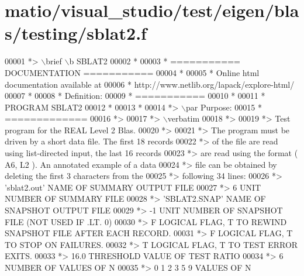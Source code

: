 \hypertarget{matio_2visual__studio_2test_2eigen_2blas_2testing_2sblat2_8f_source}{}\section{matio/visual\+\_\+studio/test/eigen/blas/testing/sblat2.f}
\label{matio_2visual__studio_2test_2eigen_2blas_2testing_2sblat2_8f_source}

\begin{DoxyCode}
00001 \textcolor{comment}{*> \(\backslash\)brief \(\backslash\)b SBLAT2}
00002 \textcolor{comment}{*}
00003 \textcolor{comment}{*  =========== DOCUMENTATION ===========}
00004 \textcolor{comment}{*}
00005 \textcolor{comment}{* Online html documentation available at }
00006 \textcolor{comment}{*            http://www.netlib.org/lapack/explore-html/ }
00007 \textcolor{comment}{*}
00008 \textcolor{comment}{*  Definition:}
00009 \textcolor{comment}{*  ===========}
00010 \textcolor{comment}{*}
00011 \textcolor{comment}{*       PROGRAM SBLAT2}
00012 \textcolor{comment}{* }
00013 \textcolor{comment}{*}
00014 \textcolor{comment}{*> \(\backslash\)par Purpose:}
00015 \textcolor{comment}{*  =============}
00016 \textcolor{comment}{*>}
00017 \textcolor{comment}{*> \(\backslash\)verbatim}
00018 \textcolor{comment}{*>}
00019 \textcolor{comment}{*> Test program for the REAL Level 2 Blas.}
00020 \textcolor{comment}{*>}
00021 \textcolor{comment}{*> The program must be driven by a short data file. The first 18 records}
00022 \textcolor{comment}{*> of the file are read using list-directed input, the last 16 records}
00023 \textcolor{comment}{*> are read using the format ( A6, L2 ). An annotated example of a data}
00024 \textcolor{comment}{*> file can be obtained by deleting the first 3 characters from the}
00025 \textcolor{comment}{*> following 34 lines:}
00026 \textcolor{comment}{*> 'sblat2.out'      NAME OF SUMMARY OUTPUT FILE}
00027 \textcolor{comment}{*> 6                 UNIT NUMBER OF SUMMARY FILE}
00028 \textcolor{comment}{*> 'SBLAT2.SNAP'     NAME OF SNAPSHOT OUTPUT FILE}
00029 \textcolor{comment}{*> -1                UNIT NUMBER OF SNAPSHOT FILE (NOT USED IF .LT. 0)}
00030 \textcolor{comment}{*> F        LOGICAL FLAG, T TO REWIND SNAPSHOT FILE AFTER EACH RECORD.}
00031 \textcolor{comment}{*> F        LOGICAL FLAG, T TO STOP ON FAILURES.}
00032 \textcolor{comment}{*> T        LOGICAL FLAG, T TO TEST ERROR EXITS.}
00033 \textcolor{comment}{*> 16.0     THRESHOLD VALUE OF TEST RATIO}
00034 \textcolor{comment}{*> 6                 NUMBER OF VALUES OF N}
00035 \textcolor{comment}{*> 0 1 2 3 5 9       VALUES OF N}

\end{DoxyCode}
